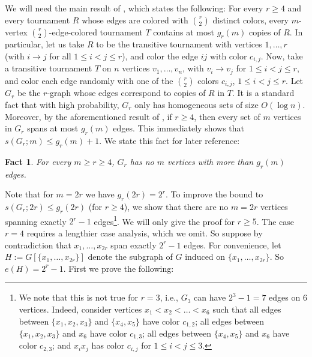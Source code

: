\documentclass[11pt]{article}
\theoremstyle{plain}
\newtheorem{fact}[theorem]{Fact}
\begin{document}
	We will need the main result of \cite{MR}, which states the following: For every $r \geq 4$ and every tournament $R$ whose edges are colored with $\binom{r}{2}$ distinct colors, every $m$-vertex $\binom{r}{2}$-edge-colored tournament $T$ contains at most $g_r(m)$ copies of $R$. In particular, let us take $R$ to be the transitive tournament with vertices $1,\dots,r$ (with $i \rightarrow j$ for all $1 \leq i < j \leq r$), and color the edge $ij$ with color $c_{i,j}$. Now, take a transitive tournament $T$ on $n$ vertices $v_1,\dots,v_n$, with $v_i \rightarrow v_j$ for $1 \leq i < j \leq r$, and color each edge randomly with one of the $\binom{r}{2}$ colors $c_{i,j}$, $1 \leq i < j \leq r$. Let $G_r$ be the $r$-graph whose edges correspond to copies of $R$ in $T$. It is a standard fact that with high probability, $G_r$ only has homogeneous sets of size $O(\log n)$. Moreover, by the aforementioned result of \cite{MR}, if $r \geq 4$, then every set of $m$ vertices in $G_r$ spans at most $g_r(m)$ edges. This immediately shows that $s(G_r;m) \leq g_r(m) + 1$. %
	We state this fact for later reference:
	\begin{fact}\label{fact:MV}
		For every $m \geq r \geq 4$, $G_r$ has no $m$ vertices with more than $g_r(m)$ edges. 
	\end{fact}
	Note that for $m=2r$ we have $g_r(2r) = 2^r$.
	To improve the bound to $s(G_r;2r) \leq g_r(2r)$ (for $r \geq 4$), we show that there are no $m = 2r$ vertices spanning exactly $2^r-1$ edges\footnote{We note that this is not true for $r=3$, i.e., $G_3$ can have $2^3-1=7$ edges on $6$ vertices. Indeed, consider vertices $x_1<x_2<\dots<x_6$ such that all edges between $\{x_1,x_2,x_3\}$ and $\{x_4,x_5\}$ have color $c_{1,2}$; all edges between $\{x_1,x_2,x_3\}$ and 
    $x_6$ have color $c_{1,3}$; all edges between $\{x_4,x_5\}$ and $x_6$ have color $c_{2,3}$; and $x_ix_j$ has color $c_{i,j}$ for $1 \leq i < j \leq 3$.}. 
    We will only give the proof for $r \geq 5$. The case $r=4$ requires a lengthier case analysis, which we omit. 
    So suppose by contradiction that $x_1,\dots,x_{2r}$ span exactly $2^r-1$ edges. 
	For convenience, let $H := G[\{x_1,\dots,x_{2r}\}]$ denote the subgraph of $G$ induced on $\{x_1,\dots,x_{2r}\}$. So $e(H) = 2^r-1$. First we prove the following:
\end{document}
